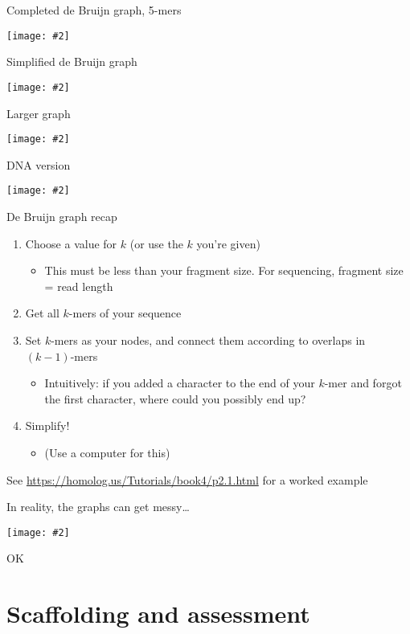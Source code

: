 \documentclass{beamer}
\renewcommand{\c}[1]{\begin{center}#1\end{center}}
\newcommand{\gr}[2][.95]{\c{\texttt{[image: \#2]}}}
\begin{document}
\begin{frame}{Completed de Bruijn graph, 5-mers}
\gr{l4_figs/s18_graph.png}
\end{frame}

\begin{frame}{Simplified de Bruijn graph}
\gr{l4_figs/s19_subgraph.png}
\end{frame}

\begin{frame}{Larger graph}
\gr{l4_figs/s20_table.png}
\end{frame}

\begin{frame}{DNA version}
\gr{l4_figs/s21_kmers.png}
\end{frame}

\begin{frame}{De Bruijn graph recap}
\begin{enumerate}
    \item Choose a value for $k$ (or use the $k$ you're given)
    \begin{itemize}
        \item This must be less than your fragment size. For sequencing, fragment size = read length
    \end{itemize}
    \item Get all $k$-mers of your sequence
    \item Set $k$-mers as your nodes, and connect them according to overlaps in $(k-1)$-mers
    \begin{itemize}
        \item Intuitively: if you added a character to the end of your $k$-mer and forgot the first character, where could you possibly end up?
    \end{itemize}
    \item Simplify!
    \begin{itemize}
        \item (Use a computer for this)
    \end{itemize}
\end{enumerate}

See \url{https://homolog.us/Tutorials/book4/p2.1.html} for a worked example
\end{frame}

\begin{frame}{In reality, the graphs can get messy\ldots}
\gr{l4_figs/s23_real_graph.png}OK
\end{frame}

\section{Scaffolding and assessment}
\end{document}
